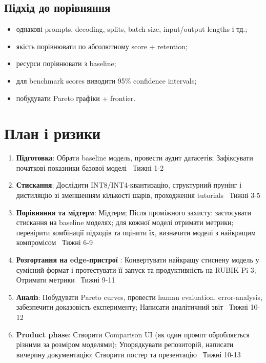 \documentclass[ukrainian]{ucuproposal}
\begin{document}
\subsection{Підхід до порівняння}
\begin{itemize}
    \item однакові prompts, decoding, splits, batch size, input/output lengths і тд.;
    \item якість порівнювати по абсолютному score + retention;
    \item ресурси порівнювати з baseline;
    \item для benchmark scores виводити 95\% confidence intervals;
    \item побудувати Pareto графіки + frontier.
\end{itemize}
\section{План і ризики}

\begin{enumerate}
    \item \textbf{Підготовка}: Обрати baseline модель, провести аудит датасетів; Зафіксувати початкові показники базової моделі \textperiodcentered\ Тижні 1-2
    \item \textbf{Стискання}: Дослідити INT8/INT4-квантизацію, структурний прунінг і дистиляцію зі зменшенням кількості шарів, проходження tutorials \textperiodcentered\ Тижні 3-5
    \item \textbf{Порівняння та мідтерм}: Мідтерм; Після проміжного захисту: застосувати стискання на baseline моделях; для кожної моделі отримати метрики; перевірити комбінації підходів та оцінити їх, визначити моделі з найкращим компромісом \textperiodcentered\ Тижні 6-9
    \item \textbf{Розгортання на edge-пристрої }: Конвертувати найкращу стиснену модель у сумісний формат і протестувати її запуск та продуктивність на RUBIK Pi 3; Отримати метрики \textperiodcentered\ Тижні 9-11
    \item \textbf{Аналіз}: Побудувати Pareto curves, провести human evaluation, error-analysis, забезпечити доказовість експерименту; Написати аналітичний звіт \textperiodcentered\ Тижні 10-12
    \item \textbf{Product phase}: Створити Comparison UI (як один промпт обробляється різними за розміром моделями); Упорядкувати репозиторій, написати вичерпну документацію; Створити постер та презентацію \textperiodcentered\ Тижні 10-13
\end{enumerate}
\end{document}
